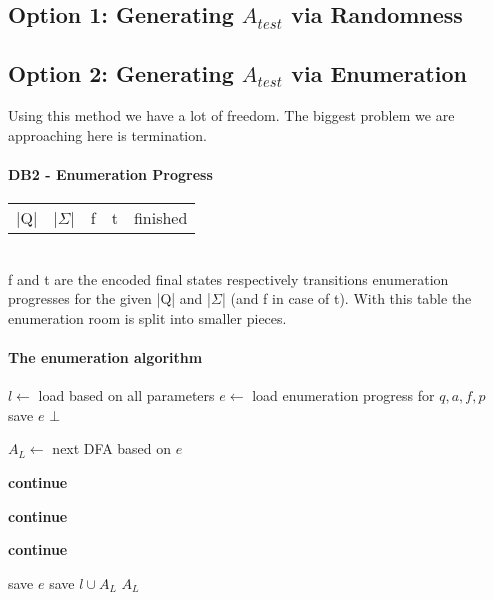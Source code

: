 \subsection{Option 1: Generating $A_{test}$ via Randomness}

\subsection{Option 2: Generating $A_{test}$ via Enumeration}

Using this method we have a lot of freedom. The biggest problem we are approaching here is termination.

\paragraph*{DB2 - Enumeration Progress}

\begin{tabular}{c c c c c}
	|Q| & |$\Sigma$| & f & t & finished
\end{tabular}\\
f and t are the encoded final states respectively transitions enumeration progresses for the given |Q| and |$\Sigma$| (and f in case of t). With this table the enumeration room is split into smaller pieces.

\paragraph*{The enumeration algorithm}

\vspace{0.2cm}
\begin{algorithmic}[1]
		\State $l \gets$ load based on all parameters
		\State $e \gets$ load enumeration progress for $q, a, f, p$
				\State save $e$
				\State\Return $\bot$
			\EndIf
			
			\State $A_L \gets$ next DFA based on $e$
			
				\State \textbf{continue}
			\EndIf
			
				\State \textbf{continue}
			\EndIf
			
				\State \textbf{continue}
			\EndIf
			
			\State save $e$
			\State save $l \cup A_L$
			\State\Return $A_L$
		\EndWhile
	\EndFunction
\end{algorithmic}
\vspace{0.2cm}

